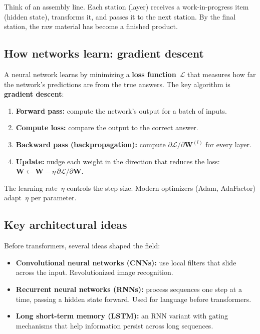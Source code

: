 \documentclass[11pt, twoside, openright]{memoir}
\begin{document}
\begin{analogy}
Think of an assembly line.  Each station (layer) receives a work-in-progress
item (hidden state), transforms it, and passes it to the next station.
By the final station, the raw material has become a finished product.
\end{analogy}

\subsection{How networks learn: gradient descent}

A neural network learns by minimizing a \textbf{loss function}~$\mathcal{L}$
that measures how far the network's predictions are from the true answers.
The key algorithm is \textbf{gradient descent}:
\begin{enumerate}[nosep]
\item \textbf{Forward pass:} compute the network's output for a batch of inputs.
\item \textbf{Compute loss:} compare the output to the correct answer.
\item \textbf{Backward pass (backpropagation):} compute
  $\partial \mathcal{L} / \partial \mathbf{W}^{(l)}$ for every layer.
\item \textbf{Update:} nudge each weight in the direction that reduces the loss:
  $\mathbf{W} \leftarrow \mathbf{W} - \eta \, \partial \mathcal{L} / \partial \mathbf{W}$.
\end{enumerate}
The learning rate~$\eta$ controls the step size.  Modern optimizers (Adam,
AdaFactor) adapt~$\eta$ per parameter.

\subsection{Key architectural ideas}

Before transformers, several ideas shaped the field:

\begin{itemize}[nosep]
\item \textbf{Convolutional neural networks (CNNs):} use local filters that
  slide across the input.  Revolutionized image recognition.
\item \textbf{Recurrent neural networks (RNNs):} process sequences one step
  at a time, passing a hidden state forward.  Used for language before
  transformers.
\item \textbf{Long short-term memory (LSTM):} an RNN variant with gating
  mechanisms that help information persist across long sequences.
\end{itemize}
\end{document}
